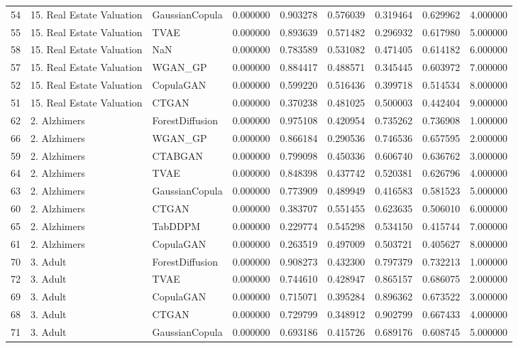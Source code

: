 \begin{tabular}{lllrrrrrr}
54 & 15. Real Estate Valuation & GaussianCopula & 0.000000 & 0.903278 & 0.576039 & 0.319464 & 0.629962 & 4.000000 \\
55 & 15. Real Estate Valuation & TVAE & 0.000000 & 0.893639 & 0.571482 & 0.296932 & 0.617980 & 5.000000 \\
58 & 15. Real Estate Valuation & NaN & 0.000000 & 0.783589 & 0.531082 & 0.471405 & 0.614182 & 6.000000 \\
57 & 15. Real Estate Valuation & WGAN_GP & 0.000000 & 0.884417 & 0.488571 & 0.345445 & 0.603972 & 7.000000 \\
52 & 15. Real Estate Valuation & CopulaGAN & 0.000000 & 0.599220 & 0.516436 & 0.399718 & 0.514534 & 8.000000 \\
51 & 15. Real Estate Valuation & CTGAN & 0.000000 & 0.370238 & 0.481025 & 0.500003 & 0.442404 & 9.000000 \\
62 & 2. Alzhimers & ForestDiffusion & 0.000000 & 0.975108 & 0.420954 & 0.735262 & 0.736908 & 1.000000 \\
66 & 2. Alzhimers & WGAN_GP & 0.000000 & 0.866184 & 0.290536 & 0.746536 & 0.657595 & 2.000000 \\
59 & 2. Alzhimers & CTABGAN & 0.000000 & 0.799098 & 0.450336 & 0.606740 & 0.636762 & 3.000000 \\
64 & 2. Alzhimers & TVAE & 0.000000 & 0.848398 & 0.437742 & 0.520381 & 0.626796 & 4.000000 \\
63 & 2. Alzhimers & GaussianCopula & 0.000000 & 0.773909 & 0.489949 & 0.416583 & 0.581523 & 5.000000 \\
60 & 2. Alzhimers & CTGAN & 0.000000 & 0.383707 & 0.551455 & 0.623635 & 0.506010 & 6.000000 \\
65 & 2. Alzhimers & TabDDPM & 0.000000 & 0.229774 & 0.545298 & 0.534150 & 0.415744 & 7.000000 \\
61 & 2. Alzhimers & CopulaGAN & 0.000000 & 0.263519 & 0.497009 & 0.503721 & 0.405627 & 8.000000 \\
70 & 3. Adult & ForestDiffusion & 0.000000 & 0.908273 & 0.432300 & 0.797379 & 0.732213 & 1.000000 \\
72 & 3. Adult & TVAE & 0.000000 & 0.744610 & 0.428947 & 0.865157 & 0.686075 & 2.000000 \\
69 & 3. Adult & CopulaGAN & 0.000000 & 0.715071 & 0.395284 & 0.896362 & 0.673522 & 3.000000 \\
68 & 3. Adult & CTGAN & 0.000000 & 0.729799 & 0.348912 & 0.902799 & 0.667433 & 4.000000 \\
71 & 3. Adult & GaussianCopula & 0.000000 & 0.693186 & 0.415726 & 0.689176 & 0.608745 & 5.000000 \\

\end{tabular}
